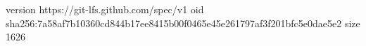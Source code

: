 version https://git-lfs.github.com/spec/v1
oid sha256:7a58af7b10360cd844b17ee8415b00f0465e45e261797af3f201bfc5e0dae5e2
size 1626
